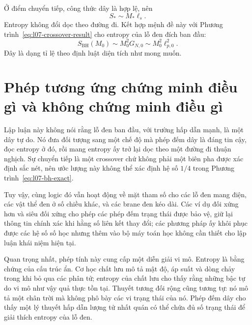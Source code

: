 Ở điểm chuyển tiếp, công thức dây là hợp lệ, nên
\begin{equation}
S_*\sim M_*\ell_s.
\end{equation}
Entropy không đổi dọc theo đường đi. Kết hợp mệnh đề này với Phương trình~\eqref{eq:l07-crossover-result} cho entropy của lỗ đen đích ban đầu:
\begin{equation}
S_{\mathrm{BH}}(M_0)
\sim M_0^2G_{N,0}
\sim M_0^2\ell_{p,0}^2.
\label{eq:l07-final-correspondence}
\end{equation}
Đây là dạng tỉ lệ theo định luật diện tích như mong muốn.

\section{Phép tương ứng chứng minh điều gì và không chứng minh điều gì}

Lập luận này không nói rằng lỗ đen ban đầu, với trường hấp dẫn mạnh, là một dây tự do. Nó đưa đối tượng sang một chế độ mà phép đếm dây là đáng tin cậy, đọc entropy ở đó, rồi mang entropy ấy trở lại dọc theo một đường đi thuận nghịch. Sự chuyển tiếp là một crossover chứ không phải một biên pha được xác định sắc nét, nên ước lượng này không thể xác định hệ số \(1/4\) trong Phương trình~\eqref{eq:l07-bh-exact}.

Tuy vậy, cùng logic đó vẫn hoạt động về mặt tham số cho các lỗ đen mang điện, các vật thể đen ở số chiều khác, và các brane đen kéo dài. Các ví dụ đối xứng hơn và siêu đối xứng cho phép các phép đếm trạng thái được bảo vệ, giữ lại thông tin chính xác khi hằng số liên kết thay đổi; các phương pháp ấy khôi phục được các hệ số số học nhưng thêm vào bộ máy toán học không cần thiết cho lập luận khái niệm hiện tại.

Quan trọng nhất, phép tính này cung cấp một diễn giải vi mô. Entropy là bằng chứng của cấu trúc ẩn. Cơ học chất lưu mô tả mật độ, áp suất và dòng chảy trong khi bỏ qua các phân tử; entropy của chất lưu cho thấy rằng những bậc tự do vi mô như vậy quả thực tồn tại. Thuyết tương đối rộng cũng tương tự: nó mô tả một chân trời mà không phô bày các vi trạng thái của nó. Phép đếm dây cho thấy một lý thuyết hấp dẫn lượng tử nhất quán có thể chứa đủ số trạng thái để giải thích entropy của lỗ đen.

\begin{classroomqa}
\end{classroomqa}

